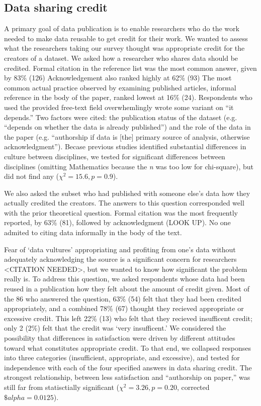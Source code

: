 \documentclass[10pt]{article}
\begin{document}
\subsection*{Data sharing credit}
A primary goal of data publication is to enable researchers who do the work needed to make data reusable to get credit for their work.
We wanted to assess what the researchers taking our survey thought was appropriate credit for the creators of a dataset.
We asked how a researcher who shares data should be credited.
Formal citation in the reference list was the most common answer, given by 83\% (126)
Acknowledgement also ranked highly at 62\% (93)
The most common actual practice observed by examining published articles, informal reference in the body of the paper\cite{sieber_not_1995, mooney_anatomy_2012}, ranked lowest at 16\% (24).
Respondents who used the provided free-text field overwhemlingly wrote some variant on ``it depends.''
Two factors were cited: the publication status of the dataset (e.g. ``depends on whether the data is already published'') and the role of the data in the paper (e.g. ``authorship if data is [the] primary source of analysis, otherwise acknowledgment'').
Becase previous studies identified substantial differences in culture between disciplines\cite{harley_assessing_2010, swan_share_2008}, we tested for significant differences between disciplines (omitting Mathematics because the \emph{n} was too low for chi-square), but did not find any ($\chi^{2}= 15.6, p= 0.9$).

We also asked the subset who had published with someone else's data how they actually credited the creators.
The answers to this question corresponded well with the prior theoretical question.
Formal citation was the most frequently reported, by 63\% (81), followed by acknowledgment (LOOK UP).
No one admited to citing data informally in the body of the text.

Fear of `data vultures' appropriating and profiting from one's data without adequately acknowledging the source is a significant concern for researchers <CITATION NEEDED>, but we wanted to know how significant the problem really is.
To address this question, we asked respondents whose data had been reused in a publication how they felt about the amount of credit given.
Most of the 86 who answered the question, 63\% (54) felt that they had been credited appropriately, and a combined 78\% (67) thought they recieved appropriate or excessive credit.
This left 22\% (13) who felt that they recieved insufficent credit; only 2 (2\%) felt that the credit was `very insufficent.'
We considered the possibility that differences in satisfaction were driven by different attitudes toward what constitutes appropriate credit.  
To that end, we collapsed responses into three categories (insufficient, appropriate, and excessive), and tested for independence with each of the four specified answers in data sharing credit.
The strongest relationship, between less satisfaction and ``authorship on paper,'' was still far from statisctially significant ($\chi^{2}= 3.26, p= 0.20$, corrected $\$alpha= 0.0125$).
\end{document}
